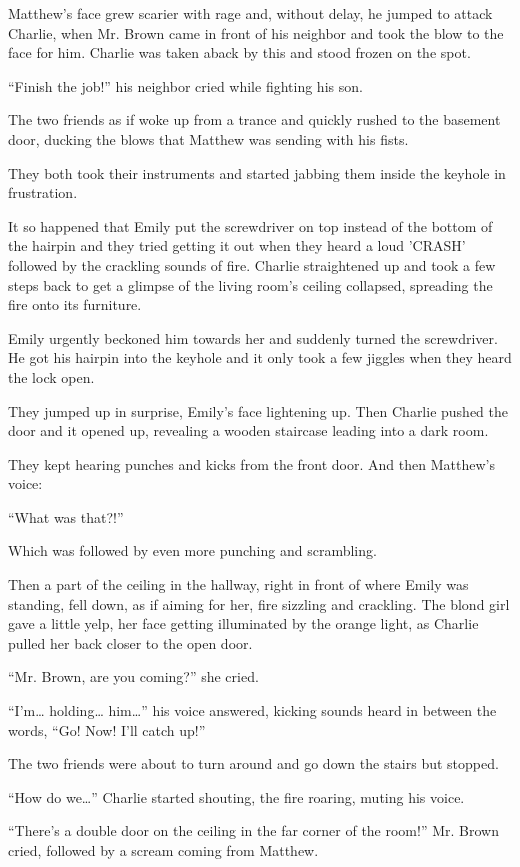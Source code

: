Matthew's face grew scarier with rage and, without delay, he jumped to attack Charlie, when Mr. Brown came in front of his neighbor and took the blow to the face for him. Charlie was taken aback by this and stood frozen on the spot.

“Finish the job!” his neighbor cried while fighting his son.

The two friends as if woke up from a trance and quickly rushed to the basement door, ducking the blows that Matthew was sending with his fists.

They both took their instruments and started jabbing them inside the keyhole in frustration.

It so happened that Emily put the screwdriver on top instead of the bottom of the hairpin and they tried getting it out when they heard a loud 'CRASH' followed by the crackling sounds of fire. Charlie straightened up and took a few steps back to get a glimpse of the living room's ceiling collapsed, spreading the fire onto its furniture.

Emily urgently beckoned him towards her and suddenly turned the screwdriver. He got his hairpin into the keyhole and it only took a few jiggles when they heard the lock open.

They jumped up in surprise, Emily's face lightening up. Then Charlie pushed the door and it opened up, revealing a wooden staircase leading into a dark room.

They kept hearing punches and kicks from the front door. And then Matthew's voice:

“What was that?!”

Which was followed by even more punching and scrambling.

Then a part of the ceiling in the hallway, right in front of where Emily was standing, fell down, as if aiming for her, fire sizzling and crackling. The blond girl gave a little yelp, her face getting illuminated by the orange light, as Charlie pulled her back closer to the open door.

“Mr. Brown, are you coming?” she cried.

“I'm… holding… him…” his voice answered, kicking sounds heard in between the words, “Go! Now! I'll catch up!”

The two friends were about to turn around and go down the stairs but stopped.

“How do we…” Charlie started shouting, the fire roaring, muting his voice.

“There's a double door on the ceiling in the far corner of the room!” Mr. Brown cried, followed by a scream coming from Matthew.

